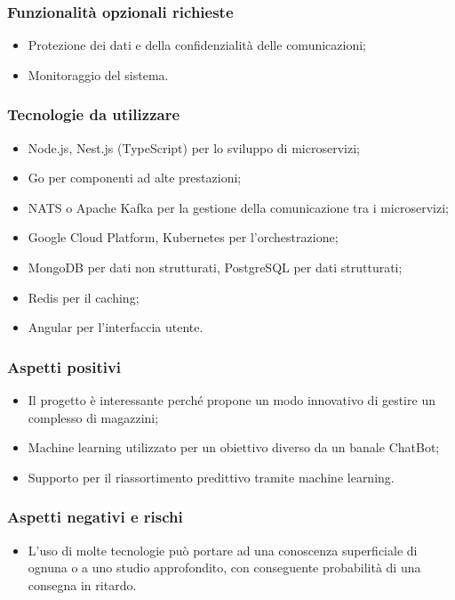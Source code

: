\documentclass[10pt]{article}
\begin{document}
\subsubsection{Funzionalità opzionali richieste}
\begin{itemize}
    \item Protezione dei dati e della confidenzialità delle comunicazioni;
    \item Monitoraggio del sistema.
\end{itemize}
\subsubsection{Tecnologie da utilizzare}
\begin{itemize}
\item Node.js, Nest.js (TypeScript) per lo sviluppo di microservizi;
\item Go per componenti ad alte prestazioni;
\item NATS o Apache Kafka per la gestione della comunicazione tra i microservizi;
\item Google Cloud Platform, Kubernetes per l'orchestrazione;
\item MongoDB per dati non strutturati, PostgreSQL per dati strutturati;
\item Redis per il caching;
\item Angular per l'interfaccia utente.
\end{itemize}
\subsubsection{Aspetti positivi}
\begin{itemize}
    \item Il progetto è interessante perché propone un modo innovativo di gestire un complesso di magazzini;
    \item Machine learning utilizzato per un obiettivo diverso da un banale ChatBot;
    \item Supporto per il riassortimento predittivo tramite machine learning.
\end{itemize}
\subsubsection{Aspetti negativi e rischi}
\begin{itemize}
\item L’uso di molte tecnologie può portare ad una conoscenza superficiale di ognuna o a uno studio approfondito, con conseguente probabilità di una consegna in ritardo.
\end{itemize}
\end{document}
